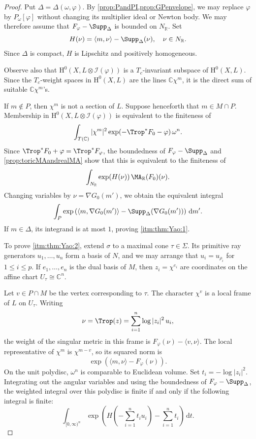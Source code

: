 \begin{proof}
    Put $\Delta=\Delta(\omega,\varphi)$. By \cref{prop:PandPI,prop:GPenvelope}, we may replace $\varphi$ by $P_{\omega}[\varphi]$ without changing its multiplier ideal or Newton body. We may therefore assume that $F_{\varphi}-\Supp_{\Delta}$ is bounded on $N_{\mathbb{R}}$. Set
    \[
        H(\nu)=\langle m,\nu\rangle-\Supp_{\Delta}(\nu),\quad \nu\in N_{\mathbb{R}}.
    \]
    Since $\Delta$ is compact, $H$ is Lipschitz and positively homogeneous.

    Observe also that $\mathrm{H}^0(X,L\otimes\mathcal{I}(\varphi))$ is a $T_c$-invariant subspace of $\mathrm{H}^0(X,L)$. Since the $T_c$-weight spaces in $\mathrm{H}^0(X,L)$ are the lines $\mathbb{C}\chi^m$, it is the direct sum of suitable $\mathbb{C}\chi^m$'s.

    If $m\notin P$, then $\chi^m$ is not a section of $L$. Suppose henceforth that $m\in M\cap P$. Membership in $\mathrm{H}^0(X,L\otimes\mathcal{I}(\varphi))$ is equivalent to the finiteness of
    \begin{equation}\label{eq:torictobefinite1}
        \int_{T(\mathbb{C})}|\chi^m|^2\exp(-\Trop^*F_0-\varphi)\,\omega^n.
    \end{equation}
    Since $\Trop^*F_0+\varphi=\Trop^*F_{\varphi}$, the boundedness of $F_{\varphi}-\Supp_{\Delta}$ and \cref{prop:toricMAandrealMA} show that this is equivalent to the finiteness of
    \[
        \int_{N_{\mathbb{R}}}\exp(H(\nu))\,\MA_{\mathbb{R}}(F_0)(\nu).
    \]
    Changing variables by $\nu=\nabla G_0(m')$, we obtain the equivalent integral
    \begin{equation}\label{eq:torictobefinite2}
        \int_P\exp\left(\langle m,\nabla G_0(m')\rangle-\Supp_{\Delta}(\nabla G_0(m'))\right)\,\mathrm{d}m'.
    \end{equation}
    If $m\in\Delta$, its integrand is at most $1$, proving \ref{itm:thm:Yao:1}.

    To prove \ref{itm:thm:Yao:2}, extend $\sigma$ to a maximal cone $\tau\in\Sigma$. Its primitive ray generators $u_1,\ldots,u_n$ form a basis of $N$, and we may arrange that $u_i=u_{\rho_i}$ for $1\leq i\leq p$. If $e_1,\ldots,e_n$ is the dual basis of $M$, then $z_i=\chi^{e_i}$ are coordinates on the affine chart $U_{\tau}\cong\mathbb{C}^n$.

    Let $v\in P\cap M$ be the vertex corresponding to $\tau$. The character $\chi^v$ is a local frame of $L$ on $U_{\tau}$. Writing
    \[
        \nu=\Trop(z)=\sum_{i=1}^n\log|z_i|^2\,u_i,
    \]
    the weight of the singular metric in this frame is $F_{\varphi}(\nu)-\langle v,\nu\rangle$. The local representative of $\chi^m$ is $\chi^{m-v}$, so its squared norm is
    \[
        \exp\left(\langle m,\nu\rangle-F_{\varphi}(\nu)\right).
    \]
    On the unit polydisc, $\omega^n$ is comparable to Euclidean volume. Set $t_i=-\log|z_i|^2$. Integrating out the angular variables and using the boundedness of $F_{\varphi}-\Supp_{\Delta}$, the weighted integral over this polydisc is finite if and only if the following integral is finite:
    \[
        \int_{[0,\infty)^n}\exp\left(H\left(-\sum_{i=1}^n t_i u_i\right)-\sum_{i=1}^n t_i\right)\,\mathrm{d}t.
    \]


\end{proof}
